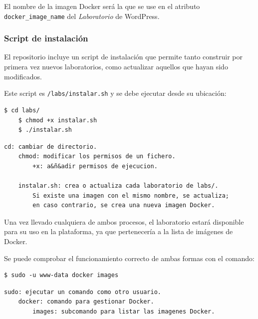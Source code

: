                     El nombre de la imagen Docker será la que se use en el atributo \texttt{docker\_image\_name} del \textit{Laboratorio} de WordPress.

            \subsubsection{Script de instalación}

                El repositorio incluye un script de instalación que permite tanto construir por primera vez nuevos laboratorios, como actualizar aquellos que hayan sido modificados.

                Este script es \texttt{/labs/instalar.sh} y se debe ejecutar desde su ubicación:
                \\

                \begin{lstlisting}[style=bash_style]
    $ cd labs/
    $ chmod +x instalar.sh
    $ ./instalar.sh
                \end{lstlisting}

                \begin{lstlisting}[style=comment_style]
    cd: cambiar de directorio.
    chmod: modificar los permisos de un fichero.
        +x: a&ñ&adir permisos de ejecucion.

    instalar.sh: crea o actualiza cada laboratorio de labs/.
        Si existe una imagen con el mismo nombre, se actualiza;
        en caso contrario, se crea una nueva imagen Docker.
                \end{lstlisting}

                Una vez llevado cualquiera de ambos procesos, el laboratorio estará disponible para su uso en la plataforma, ya que pertenecería a la lista de imágenes de Docker.

                Se puede comprobar el funcionamiento correcto de ambas formas con el comando:
                \\

                \begin{lstlisting}[style=bash_style]
    $ sudo -u www-data docker images
                \end{lstlisting}

                \begin{lstlisting}[style=comment_style]
    sudo: ejecutar un comando como otro usuario.
    docker: comando para gestionar Docker.
        images: subcomando para listar las imagenes Docker.
                \end{lstlisting}

